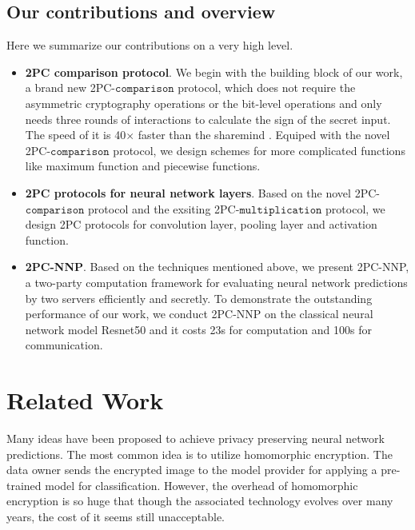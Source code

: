 \documentclass[letterpaper]{article} %
\begin{document}
    \subsection{Our contributions and overview}%
    Here we summarize our contributions on a very high level.


    \begin{itemize}
        \item \textbf{2PC comparison protocol}.
        We begin with the building block of our work, a brand new 2PC-$\mathtt{comparison}$ protocol,
        which does not require the asymmetric cryptography operations or the bit-level operations
        and only needs three rounds of interactions to calculate the sign of the secret input.
        The speed of it is 40$\times$ faster than the sharemind \cite{Sharemind}.
        Equiped with the novel 2PC-$\mathtt{comparison}$ protocol, we design schemes for more complicated functions
        like maximum function and piecewise functions.

        \item \textbf{2PC protocols for neural network layers}.
        Based on the novel 2PC-$\mathtt{comparison}$ protocol and the exsiting 2PC-$\mathtt{multiplication}$ protocol,
        we design 2PC protocols for convolution layer, pooling layer and activation function.

        \item \textbf{2PC-NNP}.
        Based on the techniques mentioned above,
        we present 2PC-NNP, a two-party computation framework
        for evaluating neural network predictions by two servers efficiently and secretly.
        To demonstrate the outstanding performance of our work,
        we conduct 2PC-NNP on the classical neural network model Resnet50 and
        it costs 23s for computation and 100s for communication.

    \end{itemize}






\section{Related Work}


    Many ideas have been proposed to achieve privacy preserving neural network predictions.
    The most common idea is to utilize homomorphic encryption.
    The data owner sends the encrypted image to the model provider for applying a pre-trained model for classification.
    However, the overhead of homomorphic encryption is so huge that though
    the associated technology evolves over many years\cite{ObliviousNeuralNetwork}, the cost of it seems still unacceptable.
\end{document}
